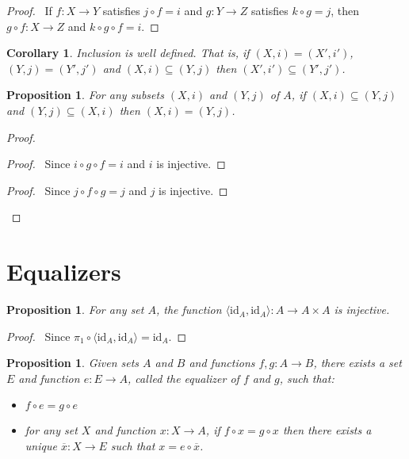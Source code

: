 \documentclass{book}
\let\qed\relax
\newtheorem{prop}[ax]{Proposition}
\newtheorem{cor}{Corollary}[ax]
\theoremstyle{definition}
\newcommand{\id}[1]{\ensuremath{\mathrm{id}_{#1}}}
\begin{document}
\begin{proof}
\pf\ If $f : X \rightarrow Y$ satisfies $j \circ f = i$ and $g : Y \rightarrow Z$ satisfies $k \circ g = j$, then $g \circ f : X \rightarrow Z$ and $k \circ g \circ f = i$. \qed
\end{proof}

\begin{cor}
Inclusion is well defined. That is, if $(X,i) = (X',i')$, $(Y,j) = (Y',j')$ and $(X,i) \subseteq (Y,j)$ then $(X',i') \subseteq (Y',j')$.
\end{cor}

\begin{prop}
For any subsets $(X,i)$ and $(Y,j)$ of $A$, if $(X,i) \subseteq (Y,j)$ and $(Y,j) \subseteq (X,i)$ then $(X,i) = (Y,j)$.
\end{prop}

\begin{proof}
\pf
{}
\step{3}{$g \circ f = \id{X}$}
\begin{proof}
	\pf\ Since $i \circ g \circ f = i$ and $i$ is injective.
\end{proof}
\step{4}{$f \circ g = \id{Y}$}
\begin{proof}
	\pf\ Since $j \circ f \circ g = j$ and $j$ is injective.
\end{proof}
\qed
\end{proof}

\section{Equalizers}

\begin{prop}
For any set $A$, the function $\langle \id{A}, \id{A} \rangle : A \rightarrow A \times A$ is injective.
\end{prop}

\begin{proof}
\pf\ Since $\pi_1 \circ \langle \id{A}, \id{A} \rangle = \id{A}$. \qed
\end{proof}

\begin{prop}
Given sets $A$ and $B$ and functions $f,g : A \rightarrow B$, there exists a set $E$ and function $e : E \rightarrow A$, called the \emph{equalizer} of $f$ and $g$, such that:
\begin{itemize}
\item $f \circ e = g \circ e$
\item for any set $X$ and function $x : X \rightarrow A$, if $f \circ x = g \circ x$ then there exists a unique $\overline{x} : X \rightarrow E$ such that $x = e \circ \overline{x}$.
\end{itemize}
\end{prop}
\end{document}
